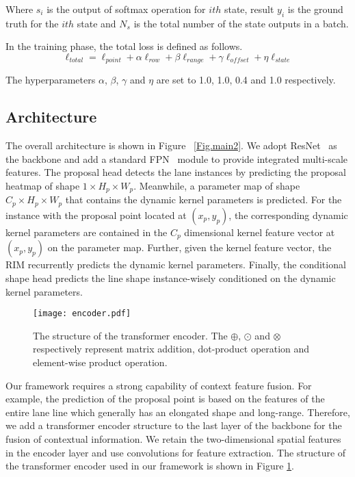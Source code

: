 \documentclass[10pt,twocolumn,letterpaper]{article}
\begin{document}
Where \(s_i\) is the output of softmax operation for \(ith\) state, result \(y_i\) is the ground truth for the \(ith\) state and \(N_s\) is the total number of the state outputs in a batch.

In the training phase, the total loss is defined as follows.
\begin{equation}
    \displaystyle
\ell _{total} = \ell _{point}+\alpha \ell _{row}+\beta \ell _{range}+\gamma \ell _{offset}+\eta \ell _{state}
\end{equation}

The hyperparameters \(\alpha\), \(\beta\), \(\gamma\) and \(\eta\) are set to 1.0, 1.0, 0.4 and 1.0 respectively.




\subsection{Architecture}
The overall architecture is shown in Figure ~\ref{Fig.main2}. We adopt ResNet~\cite{he2016deep} as the backbone and add a standard FPN~\cite{lin2017feature} module to provide integrated multi-scale features. The proposal head detects the lane instances by predicting the proposal heatmap of shape \(1 \times H_p \times W_p\). Meanwhile, a parameter map of shape \(C_p \times H_p \times W_p\) that contains the dynamic kernel parameters is predicted. For the instance with the proposal point located at \((x_p, y_p)\), the corresponding dynamic kernel parameters are contained in the \(C_p\) dimensional kernel feature vector at \((x_p, y_p)\) on the parameter map. Further, given the kernel feature vector, the RIM recurrently predicts the dynamic kernel parameters.
Finally, the conditional shape head predicts the line shape instance-wisely conditioned on the dynamic kernel parameters.

\begin{figure}[h]
\centering
\texttt{[image: encoder.pdf]}
\caption{The structure of the transformer encoder. The \(\oplus\), \(\odot\) and \(\otimes\) respectively represent matrix addition, dot-product operation and element-wise product operation.} \label{Fig.encoder} \end{figure}
Our framework requires a strong capability of context feature fusion. For example, the prediction of the proposal point is based on the features of the entire lane line which generally has an elongated shape and long-range. Therefore, we add a transformer encoder structure to the last layer of the backbone for the fusion of contextual information. We retain the two-dimensional spatial features in the encoder layer and use convolutions for feature extraction. The structure of the transformer encoder used in our framework is shown in Figure \ref{Fig.encoder}.
\end{document}
